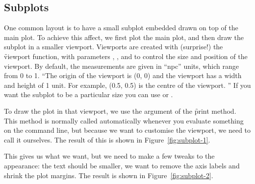 % 


\subsection{Subplots}

One common layout is to have a small subplot embedded drawn on top of the main plot.  To achieve this affect, we first plot the main plot, and then draw the subplot in a smaller viewport.  Viewports are created with (surprise!) the \f{viewport} function, with parameters , ,  and  to control the size and position of the viewport.  By default, the measurements are given in ``npc'' units, which range from 0 to 1. ``The origin of the viewport is (0, 0) and the viewport has a width and height of 1 unit. For example, (0.5, 0.5) is the centre of the viewport. '' If you want the subplot to be a particular size you can use  or .

To draw the plot in that viewport, we use the  argument of the \f{print} method.  This method is normally called automatically whenever you evaluate something on the command line, but because we want to customise the viewport, we need to call it ourselves.  The result of this is shown in Figure~\ref{fig:subplot-1}.

% 


This gives us what we want, but we need to make a few tweaks to the appearance: the text should be smaller, we want to remove the axis labels and shrink the plot margins.  The result is shown in Figure~\ref{fig:subplot-2}.

% 
% 


